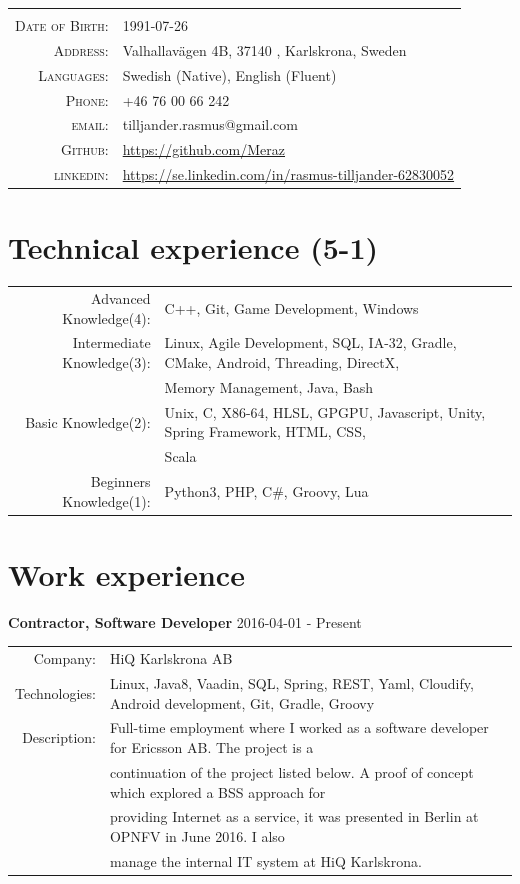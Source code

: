 \documentclass[a4paper,10pt]{article}
\begin{document}
\begin{tabular}{rl}
    \textsc{} &    \\
    \textsc{Date of Birth:} &  1991-07-26   \\
    \textsc{Address:}   & Valhallavägen 4B, 37140 , Karlskrona, Sweden \\
    \textsc{Languages:}  & Swedish (Native), English (Fluent) \\
    \textsc{Phone:}     & +46 76 00 66 242\\
    \textsc{email:}     & tilljander.rasmus@gmail.com\\
    \textsc{Github:}  & \url{https://github.com/Meraz}\\
    \textsc{linkedin:}  & \url{https://se.linkedin.com/in/rasmus-tilljander-62830052}
\end{tabular}
\section{Technical experience (5-1)}
\begin{tabular}{rl}

Advanced Knowledge(4):& C++, Git, Game Development, Windows\\
Intermediate Knowledge(3):& Linux, Agile Development, SQL, IA-32, Gradle, CMake, Android, Threading,  DirectX, \\& Memory Management, Java, Bash\\
Basic Knowledge(2):& Unix, C, X86-64, HLSL, GPGPU, Javascript, Unity, Spring Framework, HTML, CSS,\\& Scala \\
Beginners Knowledge(1):& Python3, PHP, C\#, Groovy, Lua\\
\end{tabular}

\section{Work experience}
\textbf{Contractor, Software Developer} 2016-04-01 - Present \\
\begin{tabular}{rl}
Company:& HiQ Karlskrona AB \\
Technologies:&  Linux, Java8, Vaadin, SQL, Spring, REST, Yaml, Cloudify, Android development, Git, Gradle, Groovy\\
Description:& Full-time employment where I worked as a software developer for Ericsson AB. The project is a\\&
continuation of the project listed below. A proof of concept which explored a BSS approach for\\&
providing Internet as a service, it was presented in Berlin at OPNFV in June 2016. I also\\&
manage the internal IT system at HiQ Karlskrona.
\end{tabular}\\
\end{document}
